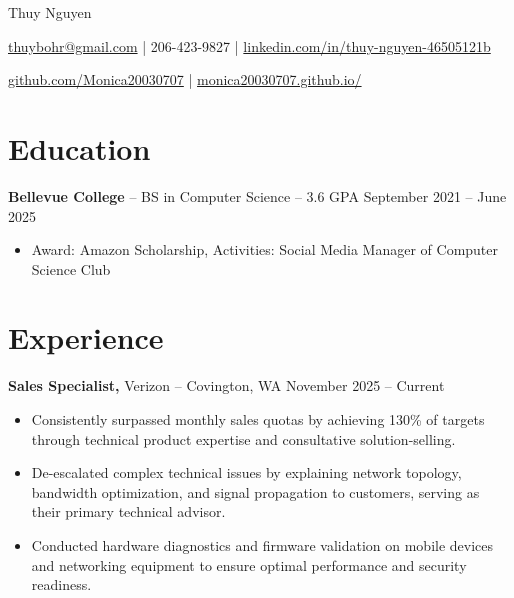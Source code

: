 \documentclass[11pt]{article}       %
\begin{document}
\centerline{\Huge Thuy Nguyen}

\vspace{5pt}

\centerline{\href{mailto:thuybohr@gmail.com}{thuybohr@gmail.com} | 206-423-9827 |
\href{https://www.linkedin.com/in/thuy-nguyen-46505121b/}{linkedin.com/in/thuy-nguyen-46505121b}}

\centerline{\href{https://github.com/Monica20030707}{github.com/Monica20030707} | 
\href{https://monica20030707.github.io/}{monica20030707.github.io/}} 

\vspace{-9pt}

\section*{Education}
\textbf{Bellevue College} -- BS in Computer Science -- 3.6 GPA \hfill September 2021 -- June 2025\\
\vspace{-9pt}
\begin{itemize}
  \item Award: Amazon Scholarship, Activities: Social Media Manager of Computer Science Club
\end{itemize}

\vspace{-18.5pt}

\section*{Experience}

\textbf{Sales Specialist,} {Verizon} -- Covington, WA \hfill November 2025 -- Current \\
\vspace{-9pt}
\begin{itemize}
  \item Consistently surpassed monthly sales quotas by achieving 130\% of targets through technical product expertise and consultative solution-selling.
  \item De-escalated complex technical issues by explaining network topology, bandwidth optimization, and signal propagation to customers, serving as their primary technical advisor.
  \item Conducted hardware diagnostics and firmware validation on mobile devices and networking equipment to ensure optimal performance and security readiness.
\end{itemize}
\end{document}

